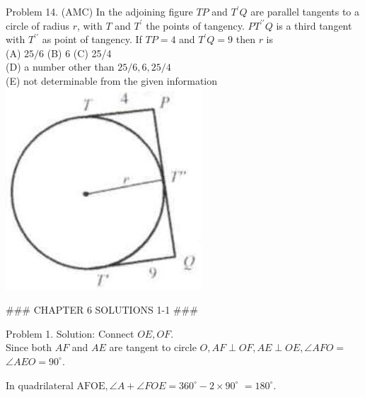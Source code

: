 \documentclass[10pt]{article}
\begin{document}
Problem 14. (AMC) In the adjoining figure \(T P\) and \(T^{\prime} Q\) are parallel tangents to a circle of radius \(r\), with \(T\) and \(T^{\prime}\) the points of tangency. \(P T^{\prime \prime} Q\) is a third tangent with \(T^{\prime \prime}\) as point of tangency. If \(T P=4\) and \(T^{\prime} Q=9\) then \(r\) is\\
(A) \(25 / 6\) (B) 6 (C) 25/4\\
(D) a number other than \(25 / 6,6,25 / 4\)\\
(E) not determinable from the given information\\
\includegraphics[max width=\textwidth, center]{2025_04_17_97bc1f7e44d93c271a88g-156(2)}


### CHAPTER 6 SOLUTIONS 1-1 ###

Problem 1. Solution:
Connect \(O E, O F\).\\
Since both \(A F\) and \(A E\) are tangent to circle \(O, A F \perp O F, A E \perp O E, \angle A F O=\) \(\angle A E O=90^{\circ}\).

In quadrilateral \(\mathrm{AFOE}, \angle A+\angle F O E=360^{\circ}-2 \times 90^{\circ}\) \(=180^{\circ}\).
\end{document}

